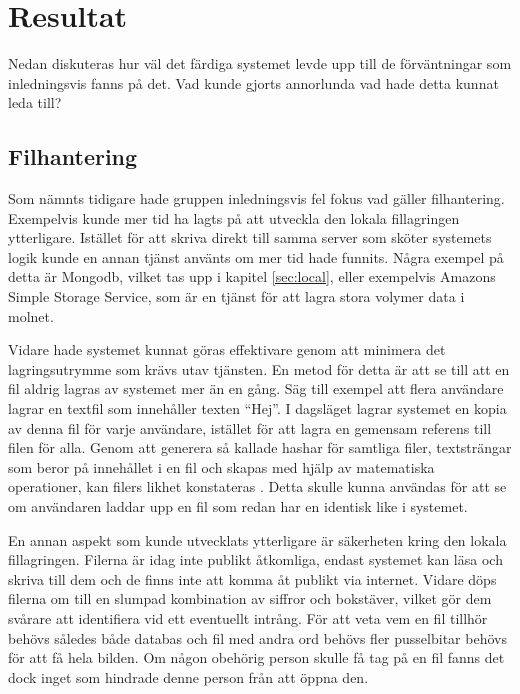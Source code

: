 \section{Resultat}

Nedan diskuteras hur väl det färdiga systemet levde upp till de förväntningar
som inledningsvis fanns på det. Vad kunde gjorts annorlunda vad hade detta
kunnat leda till?

\subsection{Filhantering}

Som nämnts tidigare hade gruppen inledningsvis fel fokus vad gäller
filhantering. Exempelvis kunde mer tid ha lagts på att utveckla den lokala
fillagringen ytterligare. Istället för att skriva direkt till samma server som
sköter systemets logik kunde en annan tjänst använts om mer tid hade funnits.
Några exempel på detta är Mongodb, vilket tas upp i kapitel \ref{sec:local},
eller exempelvis Amazons Simple Storage Service, som är en tjänst för att lagra
stora volymer data i molnet.

Vidare hade systemet kunnat göras effektivare genom att minimera det
lagringsutrymme som krävs utav tjänsten. En metod för detta är att se till att
en fil aldrig lagras av systemet mer än en gång. Säg till exempel att flera
användare lagrar en textfil som innehåller texten ``Hej''. I dagsläget lagrar
systemet en kopia av denna fil för varje användare, istället för att lagra en
gemensam referens till filen för alla. Genom att generera så kallade hashar för
samtliga filer, textsträngar som beror på innehållet i en fil och skapas med
hjälp av matematiska operationer, kan filers likhet konstateras \cite{
datastructures}. Detta skulle kunna användas för att se om användaren laddar
upp en fil som redan har en identisk like i systemet.

En annan aspekt som kunde utvecklats ytterligare är säkerheten kring den lokala
fillagringen. Filerna är idag inte publikt åtkomliga, endast systemet kan läsa
och skriva till dem och de finns inte att komma åt publikt via internet. Vidare
döps filerna om till en slumpad kombination av siffror och bokstäver, vilket
gör dem svårare att identifiera vid ett eventuellt intrång. För att veta vem en
fil tillhör behövs således både databas och fil med andra ord behövs fler
pusselbitar behövs för att få hela bilden. Om någon obehörig person skulle få
tag på en fil fanns det dock inget som hindrade denne person från att öppna den.

